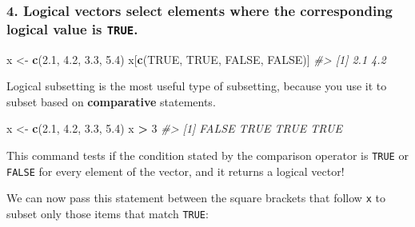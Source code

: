 \documentclass[
]{book}
\newenvironment{Shaded}{\begin{snugshade}}{\end{snugshade}}
\newcommand{\CommentTok}[1]{\textcolor[rgb]{0.56,0.35,0.01}{\textit{#1}}}
\newcommand{\DecValTok}[1]{\textcolor[rgb]{0.00,0.00,0.81}{#1}}
\newcommand{\FloatTok}[1]{\textcolor[rgb]{0.00,0.00,0.81}{#1}}
\newcommand{\KeywordTok}[1]{\textcolor[rgb]{0.13,0.29,0.53}{\textbf{#1}}}
\newcommand{\NormalTok}[1]{#1}
\newcommand{\OperatorTok}[1]{\textcolor[rgb]{0.81,0.36,0.00}{\textbf{#1}}}
\newcommand{\OtherTok}[1]{\textcolor[rgb]{0.56,0.35,0.01}{#1}}
\newcommand{\StringTok}[1]{\textcolor[rgb]{0.31,0.60,0.02}{#1}}
\begin{document}
\hypertarget{logical-vectors-select-elements-where-the-corresponding-logical-value-is-true.}{%
\subsubsection*{\texorpdfstring{4. \textbf{Logical vectors} select elements where the corresponding logical value is \texttt{TRUE}.}{4. Logical vectors select elements where the corresponding logical value is TRUE.}}\label{logical-vectors-select-elements-where-the-corresponding-logical-value-is-true.}}

\begin{Shaded}
\begin{Highlighting}[]
\NormalTok{x <-}\StringTok{ }\KeywordTok{c}\NormalTok{(}\FloatTok{2.1}\NormalTok{, }\FloatTok{4.2}\NormalTok{, }\FloatTok{3.3}\NormalTok{, }\FloatTok{5.4}\NormalTok{)}
\NormalTok{x[}\KeywordTok{c}\NormalTok{(}\OtherTok{TRUE}\NormalTok{, }\OtherTok{TRUE}\NormalTok{, }\OtherTok{FALSE}\NormalTok{, }\OtherTok{FALSE}\NormalTok{)]}
\CommentTok{#> [1] 2.1 4.2}
\end{Highlighting}
\end{Shaded}

Logical subsetting is the most useful type of subsetting, because you use it to subset based on \textbf{comparative} statements.

\begin{Shaded}
\begin{Highlighting}[]
\NormalTok{x <-}\StringTok{ }\KeywordTok{c}\NormalTok{(}\FloatTok{2.1}\NormalTok{, }\FloatTok{4.2}\NormalTok{, }\FloatTok{3.3}\NormalTok{, }\FloatTok{5.4}\NormalTok{)}
\NormalTok{x }\OperatorTok{>}\StringTok{ }\DecValTok{3}
\CommentTok{#> [1] FALSE  TRUE  TRUE  TRUE}
\end{Highlighting}
\end{Shaded}

This command tests if the condition stated by the comparison operator is \texttt{TRUE} or \texttt{FALSE} for every element of the vector, and it returns a logical vector!

We can now pass this statement between the square brackets that follow \texttt{x} to subset only those items that match \texttt{TRUE}:
\end{document}
